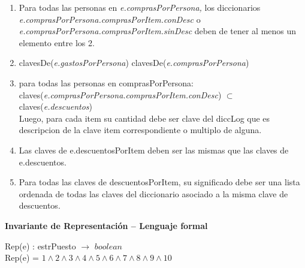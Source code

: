 \documentclass[../main.tex]{subfiles}
\begin{document}
\begin{representacion}
{\begin{enumerate}
    \item  Para todas las personas en \textit{e.comprasPorPersona,} los diccionarios \textit{e.comprasPorPersona.comprasPorItem.conDesc} o \textit{e.comprasPorPersona.comprasPorItem.sinDesc} deben de tener al menos un elemento entre los 2. 

    \item clavesDe(\textit{e.gastosPorPersona}) \igobs clavesDe(\textit{e.comprasPorPersona})%
    
    \item para todas las personas en comprasPorPersona: \\ claves(\textit{e.comprasPorPersona.comprasPorItem.conDesc}) $\subset$ claves(\textit{e.descuentos}) \\Luego, para 
cada item su cantidad debe ser clave del diccLog que es descripcion de la clave item correspondiente o multiplo de alguna.
    \item Las claves de e.descuentosPorItem deben ser las mismas que las claves de e.descuentos.
    \item Para todas las claves de descuentosPorItem, su significado debe ser una lista ordenada de todas las claves del diccionario asociado a la misma clave de descuentos. \nln

\vfill
\end{enumerate}

{\large\bfseries Invariante de Representación -- Lenguaje formal}

Rep(e) : estrPuesto $\longrightarrow$ $boolean$ \\
Rep(e) = $1 \land 2 \land 3 \land 4 \land 5 \land 6 \land 7 \land 8 \land 9 \land 10$ \nln
    
}
\end{representacion}
\end{document}
